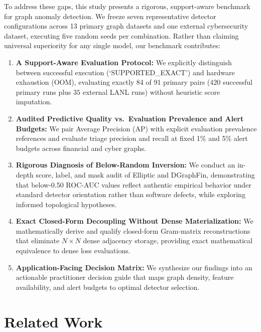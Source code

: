 \documentclass[11pt,a4paper]{article}
\begin{document}
To address these gaps, this study presents a rigorous, support-aware benchmark for graph anomaly detection. We freeze seven representative detector configurations across 13 primary graph datasets and one external cybersecurity dataset, executing five random seeds per combination. Rather than claiming universal superiority for any single model, our benchmark contributes:
\begin{enumerate}
    \item \textbf{A Support-Aware Evaluation Protocol:} We explicitly distinguish between successful execution (`SUPPORTED\_EXACT') and hardware exhaustion (OOM), evaluating exactly 84 of 91 primary pairs ($420$ successful primary runs plus $35$ external LANL runs) without heuristic score imputation.
    \item \textbf{Audited Predictive Quality vs.\ Evaluation Prevalence and Alert Budgets:} We pair Average Precision (AP) with explicit evaluation prevalence references and evaluate triage precision and recall at fixed 1\% and 5\% alert budgets across financial and cyber graphs.
    \item \textbf{Rigorous Diagnosis of Below-Random Inversion:} We conduct an in-depth score, label, and mask audit of Elliptic and DGraphFin, demonstrating that below-0.50 ROC-AUC values reflect authentic empirical behavior under standard detector orientation rather than software defects, while exploring informed topological hypotheses.
    \item \textbf{Exact Closed-Form Decoupling Without Dense Materialization:} We mathematically derive and qualify closed-form Gram-matrix reconstructions that eliminate $N \times N$ dense adjacency storage, providing exact mathematical equivalence to dense loss evaluations.
    \item \textbf{Application-Facing Decision Matrix:} We synthesize our findings into an actionable practitioner decision guide that maps graph density, feature availability, and alert budgets to optimal detector selection.
\end{enumerate}

\section{Related Work}
\label{sec:related}
\end{document}
